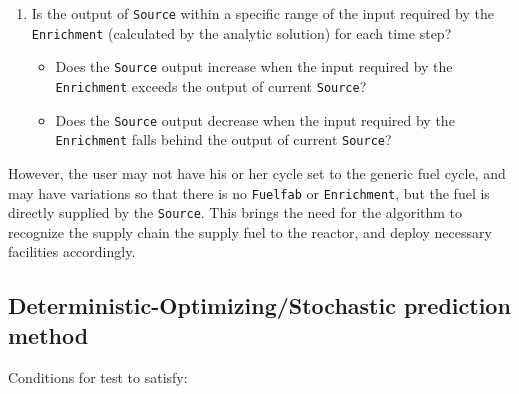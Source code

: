 \documentclass[12pt,letterpaper]{article}
\begin{document}
\begin{enumerate}
\item Is the output of \texttt{Source} within a specific range of the input required by the \texttt{Enrichment} (calculated by the analytic solution) for each time step? 
\begin{itemize}
\item Does the \texttt{Source} output increase when the input required by the \texttt{Enrichment} exceeds the output of current \texttt{Source}?
\item Does the \texttt{Source} output decrease when the input required by the \texttt{Enrichment} falls behind the output of current \texttt{Source}?
\end{itemize}


\end{enumerate}


However, the user may not have his or her cycle set to the generic fuel cycle, and may have
variations so that there is no \texttt{Fuelfab} or \texttt{Enrichment}, but the fuel is
directly supplied by the \texttt{Source}. This brings the need for the algorithm to recognize
the supply chain the supply fuel to the reactor, and deploy necessary facilities accordingly. 


\subsection{Deterministic-Optimizing/Stochastic prediction method}
Conditions for test to satisfy: 
\end{document}
